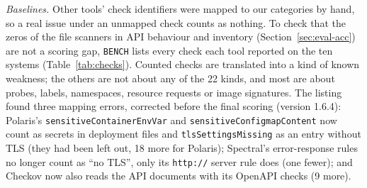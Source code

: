 \documentclass[conference]{IEEEtran}
\begin{document}
\textit{Baselines.} Other tools' check identifiers were mapped to our categories by hand, so a real issue under an unmapped check counts as nothing. To check that the zeros of the file scanners in API behaviour and inventory (Section~\ref{sec:eval-acc}) are not a scoring gap, \texttt{BENCH} lists every check each tool reported on the ten systems (Table~\ref{tab:checks}). Counted checks are translated into a kind of known weakness; the others are not about any of the 22 kinds, and most are about probes, labels, namespaces, resource requests or image signatures. The listing found three mapping errors, corrected before the final scoring (version 1.6.4): Polaris's \texttt{sensitiveContainerEnvVar} and \texttt{sensitiveConfigmapContent} now count as secrets in deployment files and \texttt{tlsSettingsMissing} as an entry without TLS (they had been left out, 18 more for Polaris); Spectral's error-response rules no longer count as ``no TLS'', only its \texttt{http://} server rule does (one fewer); and Checkov now also reads the API documents with its OpenAPI checks (9 more).
\end{document}
